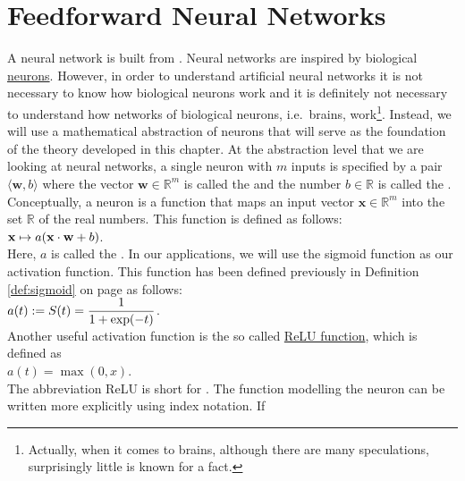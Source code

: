 \section{Feedforward Neural Networks}
A neural network is built from .  Neural networks are inspired by biological 
\href{https://en.wikipedia.org/wiki/Neuron}{neurons}.  However, in order to understand artificial neural
networks it is not necessary to know how biological neurons work and it is definitely not necessary to
understand how networks of biological neurons, i.e.~brains, work\footnote{
  Actually, when it comes to brains, although there are many speculations, surprisingly little is known for a fact.  
}.  
Instead, we will use a mathematical abstraction of neurons that will serve as the foundation of the theory
developed in this chapter.  At the abstraction level that we are looking at neural networks, a single neuron
with $m$ inputs is specified by a pair $\langle \mathbf{w}, b\rangle$ where the vector $\mathbf{w} \in \mathbb{R}^m$ is called the  and 
the number $b \in \mathbb{R}$ is called the .   
Conceptually, a neuron is a function that maps an input vector $\mathbf{x} \in \mathbb{R}^m$ into the set
$\mathbb{R}$ of the real numbers.  This function is defined as follows: 
\\[0.2cm]
\hspace*{1.3cm}
$\displaystyle \mathbf{x} \mapsto a(\mathbf{x} \cdot \mathbf{w} + b)$.
\\[0.2cm]
Here, $a$ is called the .   In our applications, we will
use the sigmoid function as our activation function.  This function has been defined previously in Definition
\ref{def:sigmoid} on page \pageref{def:sigmoid} as follows:
\\[0.2cm]
\hspace*{1.3cm}
$\displaystyle a(t) := S(t) = \frac{1}{1 + \exp(-t)}$.
\\[0.2cm]
Another useful activation function is the so called
\href{https://en.wikipedia.org/wiki/Rectifier_(neural_networks)}{ReLU function}, 
which is defined as 
\\[0.2cm]
\hspace*{1.3cm}
$a(t) = \max(0, x)$.
\\[0.2cm]
The abbreviation ReLU is short for . 
The function modelling the neuron can be written more explicitly using index notation.  If
\\[0.2cm]
\hspace*{1.3cm}
